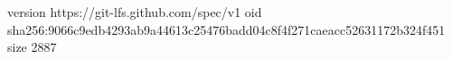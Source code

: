 version https://git-lfs.github.com/spec/v1
oid sha256:9066c9edb4293ab9a44613c25476badd04c8f4f271caeacc52631172b324f451
size 2887
